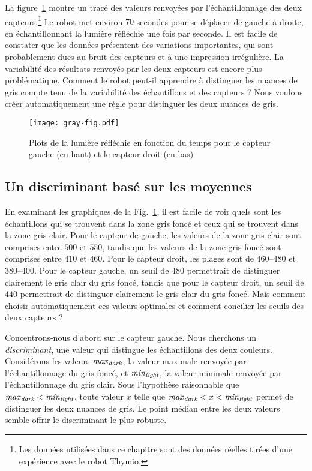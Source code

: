 La figure~\ref{fig.closegrays2} montre un tracé des valeurs renvoyées par l'échantillonnage des deux capteurs.\footnote{Les données utilisées dans ce chapitre sont des données réelles tirées d'une expérience avec le robot Thymio.} Le robot met environ $70$ secondes pour se déplacer de gauche à droite, en échantillonnant la lumière réfléchie une fois par seconde. Il est facile de constater que les données présentent des variations importantes, qui sont probablement dues au bruit des capteurs et à une impression irrégulière. La variabilité des résultats renvoyés par les deux capteurs est encore plus problématique. Comment le robot peut-il apprendre à distinguer les nuances de gris compte tenu de la variabilité des échantillons et des capteurs ? Nous voulons créer automatiquement une règle pour distinguer les deux nuances de gris.

\begin{figure}
\begin{center}
\texttt{[image: gray-fig.pdf]}
\end{center}
\caption{Plots de la lumière réfléchie en fonction du temps pour le capteur gauche (en haut) et le capteur droit (en bas)}\label{fig.closegrays2}
\end{figure}

\subsection{Un discriminant basé sur les moyennes}

En examinant les graphiques de la Fig.~\ref{fig.closegrays2}, il est facile de voir quels sont les échantillons qui se trouvent dans la zone gris foncé et ceux qui se trouvent dans la zone gris clair. Pour le capteur de gauche, les valeurs de la zone gris clair sont comprises entre $500$ et $550$, tandis que les valeurs de la zone gris foncé sont comprises entre $410$ et $460$. Pour le capteur droit, les plages sont de $460$--$480$ et $380$--$400$. Pour le capteur gauche, un seuil de $480$ permettrait de distinguer clairement le gris clair du gris foncé, tandis que pour le capteur droit, un seuil de $440$ permettrait de distinguer clairement le gris clair du gris foncé. Mais comment choisir automatiquement ces valeurs optimales et comment concilier les seuils des deux capteurs ?

Concentrons-nous d'abord sur le capteur gauche. Nous cherchons un \textit{discriminant}, une valeur qui distingue les échantillons des deux couleurs. Considérons les valeurs $\mathit{max}_{\textit{\scriptsize dark}}$, la valeur maximale renvoyée par l'échantillonnage du gris foncé, et $\mathit{min}_{\textit{\scriptsize light}}$, la valeur minimale renvoyée par l'échantillonnage du gris clair. Sous l'hypothèse raisonnable que
$\mathit{max}_{\textit{\scriptsize dark}} < \mathit{min}_{\textit{\scriptsize light}}$, toute valeur $x$ telle que 
$\mathit{max}_{\textit{\scriptsize dark}} < x < \mathit{min}_{\textit{\scriptsize light}}$ permet de distinguer les deux nuances de gris. Le point médian entre les deux valeurs semble offrir le discriminant le plus robuste.

